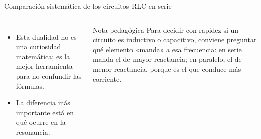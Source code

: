 \documentclass[aspectratio=169,11pt,xcolor={table}]{beamer}
\begin{document}
\begin{frame}{{\normalsize Comparación sistemática de los circuitos RLC en serie}}
\begin{columns}[c,onlytextwidth]
\small
\begin{itemize}\setlength{\itemsep}{4pt}
  \item Esta dualidad no es una curiosidad matemática; es la mejor herramienta para no confundir las fórmulas.
  \item La diferencia más importante está en qué ocurre en la resonancia.
\end{itemize}
\begin{cardO}{Nota pedagógica}
\footnotesize Para decidir con rapidez si un circuito es inductivo o capacitivo, conviene preguntar qué elemento «manda» a esa frecuencia: en serie manda el de mayor reactancia; en paralelo, el de menor reactancia, porque es el que conduce más corriente.
\end{cardO}
\end{columns}
\end{frame}
\end{document}
